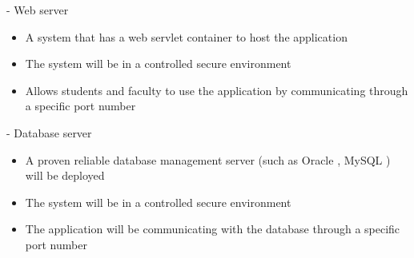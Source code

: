 - Web server 	
  \begin{itemize}
      \item A system that has a web servlet container to host the application
      \item The system will be in a controlled secure environment 
      \item Allows students and faculty to use the application by communicating through a specific port number
  \end{itemize}    
- Database server 
  \begin{itemize}
      \item A proven reliable database management server (such as Oracle , MySQL ) will be deployed 
      \item The system will be in a controlled secure environment 
      \item The application will be communicating with the database through a specific port number
  \end{itemize}
